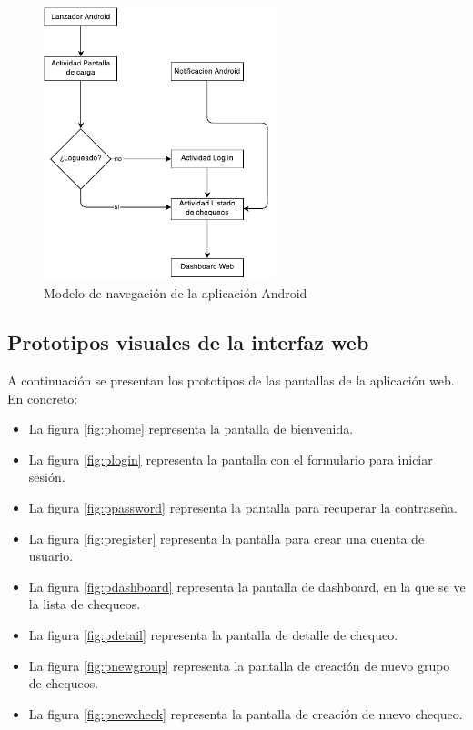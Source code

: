 \begin{figure}[hbtp]
  \centering
  \includegraphics[width=0.6\textwidth]{4_analisis/diagrama_navegacion_android}
  \caption{Modelo de navegación de la aplicación Android}
  \label{fig:modelo-navegacion-android}
\end{figure}

\subsection{Prototipos visuales de la interfaz web}

A continuación se presentan los prototipos de las pantallas de la aplicación
web. En concreto:

\begin{itemize}
\item La figura \ref{fig:phome} representa la pantalla de bienvenida.
\item La figura \ref{fig:plogin} representa la pantalla con el formulario para
  iniciar sesión.
\item La figura \ref{fig:ppassword} representa la pantalla para recuperar la contraseña.
\item La figura \ref{fig:pregister} representa la pantalla para crear una cuenta de usuario.
\item La figura \ref{fig:pdashboard} representa la pantalla de dashboard, en la que se ve la lista de chequeos.
\item La figura \ref{fig:pdetail} representa la pantalla de detalle de chequeo.
\item La figura \ref{fig:pnewgroup} representa la pantalla de creación de nuevo grupo de chequeos.
\item La figura \ref{fig:pnewcheck} representa la pantalla de creación de nuevo chequeo.
\end{itemize}

